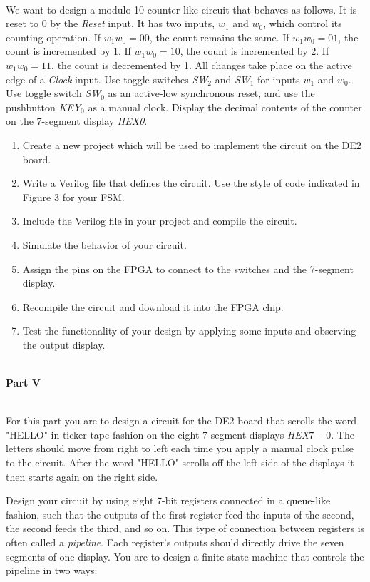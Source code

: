 \documentclass[epsfig,10pt,fullpage]{article}
\begin{document}
~\\
\noindent
We want to design a modulo-10 counter-like circuit that behaves as follows.
It is reset to 0 by the {\it Reset} input.
It has two inputs, $w_1$ and $w_0$, which control its counting operation.
If $w_1 w_0 = 00$, the count remains the same. If $w_1 w_0 = 01$, the count
is incremented by 1. If $w_1 w_0 = 10$, the count is incremented by 2.
If $w_1 w_0 = 11$, the count is decremented by 1. All changes take place on
the active edge of a {\it Clock} input.
Use toggle switches {\it SW}$_2$ and {\it SW}$_1$ for inputs $w_1$ and $w_0$.
Use toggle switch {\it SW}$_0$ as an active-low synchronous reset, and use
the pushbutton {\it KEY}$_0$ as a manual clock.
Display the decimal contents of the counter on the 7-segment display {\it HEX0}.
\begin{enumerate}
\item Create a new project which will be used to implement the 
circuit on the DE2 board.
\item Write a Verilog file that defines the circuit. Use the style of code indicated
in Figure 3 for your FSM.
\item Include the Verilog file in your project and compile the circuit.
\item Simulate the behavior of your circuit.
\item Assign the pins on the FPGA to connect to the switches and the 7-segment
display.
\item Recompile the circuit and download it into the FPGA chip.
\item Test the functionality of your design by applying some inputs
and observing the output display.
\end{enumerate}

~\\
\noindent
{\bf Part V}

~\\
\noindent
For this part you are to design a circuit for the DE2 board that
scrolls the word "HELLO" in ticker-tape fashion
on the eight 7-segment displays {\it HEX}$7-0$. The 
letters should move from right to left each time you apply a manual clock pulse 
to the circuit. After the word "HELLO" scrolls off the left side of the displays 
it then starts again on the right side. 

Design your circuit by using eight 7-bit registers connected in a queue-like fashion,
such that the outputs of the first register feed the inputs of the
second, the second feeds the third, and so on. This type of connection between registers
is often called a {\it pipeline}. Each register's outputs
should directly drive the seven segments of one display. You are to design a finite state
machine that controls the pipeline in two ways:
\end{document}
